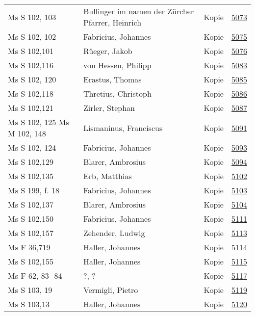 \documentclass[10pt,a4paper,landscape]{report}
\begin{document}
\begin{longtable}{p{16cm}p{4cm}lr}
Ms S 102, 103	&	Bullinger im namen der Zürcher Pfarrer, Heinrich	&	Kopie	&	\href{http://130.60.24.72/assignment/5073}{5073}\\
Ms S 102, 102	&	Fabricius, Johannes	&	Kopie	&	\href{http://130.60.24.72/assignment/5075}{5075}\\
Ms S 102,101	&	Rüeger, Jakob	&	Kopie	&	\href{http://130.60.24.72/assignment/5076}{5076}\\
Ms S 102,116	&	von Hessen, Philipp	&	Kopie	&	\href{http://130.60.24.72/assignment/5083}{5083}\\
Ms S 102, 120	&	Erastus, Thomas	&	Kopie	&	\href{http://130.60.24.72/assignment/5085}{5085}\\
Ms S 102,118	&	Thretius, Christoph	&	Kopie	&	\href{http://130.60.24.72/assignment/5086}{5086}\\
Ms S 102,121	&	Zirler, Stephan	&	Kopie	&	\href{http://130.60.24.72/assignment/5087}{5087}\\
Ms S 102, 125  Ms M 102, 148	&	Lismaninus, Franciscus	&	Kopie	&	\href{http://130.60.24.72/assignment/5091}{5091}\\
Ms S 102, 124	&	Fabricius, Johannes	&	Kopie	&	\href{http://130.60.24.72/assignment/5093}{5093}\\
Ms S 102,129	&	Blarer, Ambrosius	&	Kopie	&	\href{http://130.60.24.72/assignment/5094}{5094}\\
Ms S 102,135	&	Erb, Matthias	&	Kopie	&	\href{http://130.60.24.72/assignment/5102}{5102}\\
Ms S 199, f. 18	&	Fabricius, Johannes	&	Kopie	&	\href{http://130.60.24.72/assignment/5103}{5103}\\
Ms S 102,137	&	Blarer, Ambrosius	&	Kopie	&	\href{http://130.60.24.72/assignment/5104}{5104}\\
Ms S 102,150	&	Fabricius, Johannes	&	Kopie	&	\href{http://130.60.24.72/assignment/5111}{5111}\\
Ms S 102,157	&	Zehender, Ludwig	&	Kopie	&	\href{http://130.60.24.72/assignment/5113}{5113}\\
Ms F 36,719	&	Haller, Johannes	&	Kopie	&	\href{http://130.60.24.72/assignment/5114}{5114}\\
Ms S 102,155	&	Haller, Johannes	&	Kopie	&	\href{http://130.60.24.72/assignment/5115}{5115}\\
Ms F 62, 83- 84	&	?, ?	&	Kopie	&	\href{http://130.60.24.72/assignment/5117}{5117}\\
Ms S 103, 19	&	Vermigli, Pietro	&	Kopie	&	\href{http://130.60.24.72/assignment/5119}{5119}\\
Ms S 103,13	&	Haller, Johannes	&	Kopie	&	\href{http://130.60.24.72/assignment/5120}{5120}\\

\end{longtable}
\end{document}
